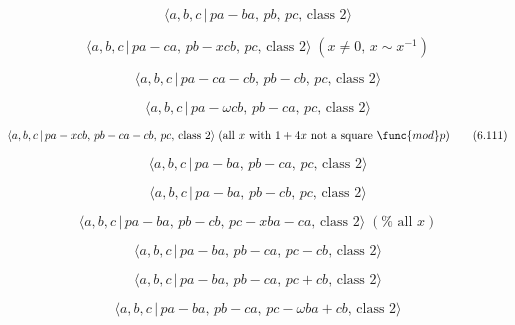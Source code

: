 \documentclass[10pt]{article}
\begin{document}
\begin{equation}
\langle a,b,c\,|\,pa-ba,\,pb,\,pc,\,\text{class }2\rangle  \tag{6.106}
\end{equation}

\begin{equation}
\langle a,b,c\,|\,pa-ca,\,pb-xcb,\,pc,\,\text{class }2\rangle \;(x\neq
0,\,x\sim x^{-1})  \tag{6.108}
\end{equation}

\begin{equation}
\langle a,b,c\,|\,pa-ca-cb,\,pb-cb,\,pc,\,\text{class }2\rangle  \tag{6.109}
\end{equation}

\begin{equation}
\langle a,b,c\,|\,pa-\omega cb,\,pb-ca,\,pc,\,\text{class }2\rangle 
\tag{6.110}
\end{equation}

\begin{equation}
\langle a,b,c\,|\,pa-xcb,\,pb-ca-cb,\,pc,\,\text{class }2\rangle \;(\text{%
all }x\text{ with }1+4x\text{ not a square }\func{mod}p)  \tag{6.111}
\end{equation}

\begin{equation}
\langle a,b,c\,|\,pa-ba,\,pb-ca,\,pc,\,\text{class }2\rangle  \tag{6.112}
\end{equation}

\begin{equation}
\langle a,b,c\,|\,pa-ba,\,pb-cb,\,pc,\,\text{class }2\rangle  \tag{6.113}
\end{equation}

\begin{equation}
\langle a,b,c\,|\,pa-ba,\,pb-cb,\,pc-xba-ca,\,\text{class }2\rangle \;(\text{%
all }x)  \tag{6.114}
\end{equation}

\begin{equation}
\langle a,b,c\,|\,pa-ba,\,pb-ca,\,pc-cb,\,\text{class }2\rangle  \tag{6.115}
\end{equation}

\begin{equation}
\langle a,b,c\,|\,pa-ba,\,pb-ca,\,pc+cb,\,\text{class }2\rangle  \tag{6.116}
\end{equation}

\begin{equation}
\langle a,b,c\,|\,pa-ba,\,pb-ca,\,pc-\omega ba+cb,\,\text{class }2\rangle 
\tag{6.117}
\end{equation}
\end{document}
